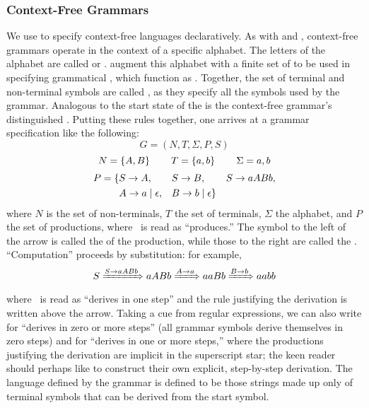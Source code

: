 \subsubsection{Context-Free Grammars}
We use  to specify context-free languages declaratively. As with \regexes and \FAs, context-free grammars operate in the context of a specific alphabet. The letters of the alphabet are called  or . \CFGs[C] augment this alphabet with a finite set of  to be used in specifying grammatical , which function as . Together, the set of terminal and non-terminal symbols are called , as they specify all the symbols used by the grammar. Analogous to the start state of the \FA is the context-free grammar's distinguished . Putting these rules together, one arrives at a grammar specification like the following:
\[
G = \left(N, T, \Sigma, P, S\right)
\]%
\[
N = \left\{ A, B \right\} \qquad T = \left\{ a, b \right\} \qquad \Sigma = {a, b}
\]
\[\begin{split}
P = \{&S \rightarrow A, &&S \rightarrow B, &&S \rightarrow aABb,\\
&A \rightarrow a \mid \epsilon, &&B \rightarrow b \mid \epsilon\}
\end{split}\]
where $N$ is the set of non-terminals, $T$ the set of terminals, $\Sigma$ the alphabet, and $P$ the set of productions, where \produces\ is read as ``produces.'' The symbol to the left of the arrow is called the  of the production, while those to the right are called the . %
``Computation'' proceeds by substitution: for example,
\[
S \derives[S \produces aABb] aABb \derives[A \produces a] aaBb \derives[B \produces b] aabb
\]
where \derives\ is read as ``derives in one step'' and the rule justifying the derivation is written above the arrow. Taking a cue from regular expressions, we can also write \derives[\star] for ``derives in zero or more steps'' (all grammar symbols derive themselves in zero steps) and \derives[+] for ``derives in one or more steps,'' where the productions justifying the derivation are implicit in the superscript star; the keen reader should perhaps like to construct their own explicit, step-by-step derivation. The language defined by the grammar is defined to be those strings made up only of terminal symbols that can be derived from the start symbol.

